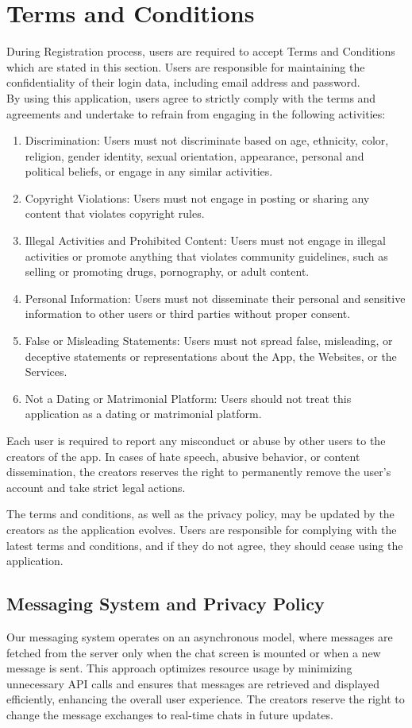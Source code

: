 \section{Terms and Conditions}\label{sec:tnc}
During Registration process, users are required to accept Terms and Conditions which are stated in this section. Users are responsible for maintaining the confidentiality of their login data, including email address and password. \\
By using this application, users agree to strictly comply with the terms and agreements and undertake to refrain from engaging in the following activities:
\begin{enumerate}
    \item Discrimination: Users must not discriminate based on age, ethnicity, color, religion, gender identity, sexual orientation, appearance, personal and political beliefs, or engage in any similar activities.
    \item Copyright Violations: Users must not engage in posting or sharing any content that violates copyright rules.
    \item Illegal Activities and Prohibited Content: Users must not engage in illegal activities or promote anything that violates community guidelines, such as selling or promoting drugs, pornography, or adult content.
    \item Personal Information: Users must not disseminate their personal and sensitive information to other users or third parties without proper consent.
    \item False or Misleading Statements: Users must not spread false, misleading, or deceptive statements or representations about the App, the Websites, or the Services.
    \item Not a Dating or Matrimonial Platform: Users should not treat this application as a dating or matrimonial platform.
\end{enumerate}
Each user is required to report any misconduct or abuse by other users to the creators of the app. In cases of hate speech, abusive behavior, or content dissemination, the creators reserves the right to permanently remove the user's account and take strict legal actions.

The terms and conditions, as well as the privacy policy, may be updated by the creators as the application evolves. Users are responsible for complying with the latest terms and conditions, and if they do not agree, they should cease using the application.
\subsection{Messaging System and Privacy Policy}
Our messaging system operates on an asynchronous model, where messages are fetched from the server only when the chat screen is mounted or when a new message is sent. This approach optimizes resource usage by minimizing unnecessary API calls and ensures that messages are retrieved and displayed efficiently, enhancing the overall user experience. The creators reserve the right to change the message exchanges to real-time chats in future updates.
